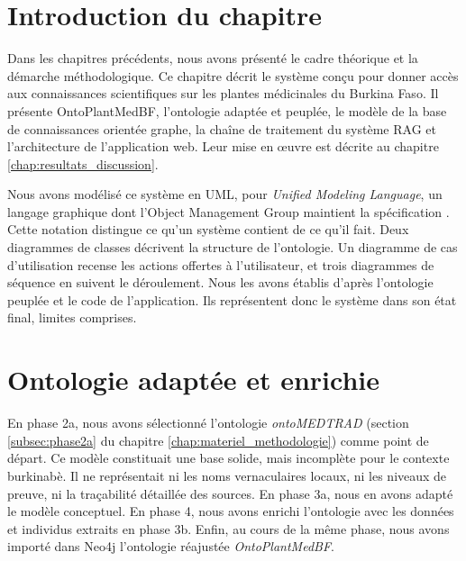 

\section*{Introduction du chapitre}

Dans les chapitres précédents, nous avons présenté le cadre théorique et la démarche méthodologique. Ce chapitre décrit le système conçu pour donner accès aux connaissances scientifiques sur les plantes médicinales du Burkina Faso. Il présente OntoPlantMedBF, l'ontologie adaptée et peuplée, le modèle de la base de connaissances orientée graphe, la chaîne de traitement du système RAG et l'architecture de l'application web. Leur mise en œuvre est décrite au chapitre \ref{chap:resultats_discussion}.

Nous avons modélisé ce système en UML, pour \textit{Unified Modeling Language}, un langage graphique dont l'Object Management Group maintient la spécification \cite{omg_uml_2017}. Cette notation distingue ce qu'un système contient de ce qu'il fait. Deux diagrammes de classes décrivent la structure de l'ontologie. Un diagramme de cas d'utilisation recense les actions offertes à l'utilisateur, et trois diagrammes de séquence en suivent le déroulement. Nous les avons établis d'après l'ontologie peuplée et le code de l'application. Ils représentent donc le système dans son état final, limites comprises.


\section{Ontologie adaptée et enrichie}
\label{sec:ontologie_adaptee}

En phase 2a, nous avons sélectionné l'ontologie \textit{ontoMEDTRAD} \cite{kouame_systeme_2018} (section \ref{subsec:phase2a} du chapitre \ref{chap:materiel_methodologie}) comme point de départ. Ce modèle constituait une base solide, mais incomplète pour le contexte burkinabè. Il ne représentait ni les noms vernaculaires locaux, ni les niveaux de preuve, ni la traçabilité détaillée des sources. En phase 3a, nous en avons adapté le modèle conceptuel. En phase 4, nous avons enrichi l'ontologie avec les données et individus extraits en phase 3b. Enfin, au cours de la même phase, nous avons importé dans Neo4j l'ontologie réajustée \textit{OntoPlantMedBF}.

